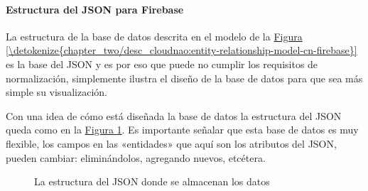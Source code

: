 \paragraph{Estructura del JSON para Firebase}
\label{\detokenize{chapter_two/desc_cloudnao:estructura-del-json-para-firebase}}
La estructura de la base de datos descrita en el modelo de la \hyperref[\detokenize{chapter_two/desc_cloudnao:entity-relationship-model-cn-firebase}]{Figura \ref{\detokenize{chapter_two/desc_cloudnao:entity-relationship-model-cn-firebase}}}
es la base del JSON y es por eso que puede no cumplir los requisitos de normalización,
simplemente ilustra el diseño de la base de datos para que sea más simple su
visualización.

Con una idea de cómo está diseñada la base de datos la estructura del JSON
queda como en la \hyperref[\detokenize{chapter_two/desc_cloudnao:json-structure}]{Figura \ref{\detokenize{chapter_two/desc_cloudnao:json-structure}}}. Es importante señalar que esta base de datos
es muy flexible, los campos en las «entidades» que aquí son los atributos
del JSON, pueden cambiar: eliminándolos, agregando nuevos, etcétera.

\begin{figure}[htbp]
\centering
\capstart

\noindent{}
\caption{La estructura del JSON donde se almacenan los datos}\label{\detokenize{chapter_two/desc_cloudnao:json-structure}}\end{figure}

